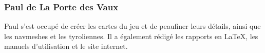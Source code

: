     \vspace{0.5cm}
    \subsubsection{Paul de La Porte des Vaux}

        Paul s'est occupé de créer les cartes du jeu et de peaufiner leurs détails, ainsi que les navmeshes et les tyroliennes. Il a également 
        rédigé les rapports en LaTeX, les manuels d'utilisation et le site internet.

    \vspace{0.5cm}

    \newpage